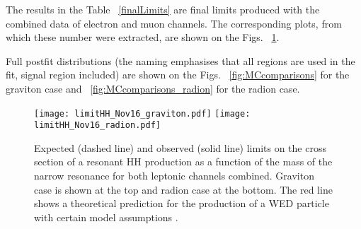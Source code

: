 The results in the Table ~\ref{finalLimits} are final limits produced with the combined data of electron and muon channels. The corresponding plots, from which these number were extracted, are shown on the Figs. ~\ref{fig:HHlimits}. %

Full postfit distributions (the naming emphasises that all regions are used in the fit, signal region included) are shown on the Figs. ~\ref{fig:MCcomparisons} for the graviton case and ~\ref{fig:MCcomparisons_radion} for the radion case. 







\begin{figure}[!htb]%
  \begin{center}
    \texttt{[image: limitHH\_Nov16\_graviton.pdf]}
    \texttt{[image: limitHH\_Nov16\_radion.pdf]}
    \caption{ Expected (dashed line) and observed (solid line) limits on the cross section of a resonant HH production
      as a function of the mass of the narrow resonance for both leptonic channels combined. Graviton case is shown at the top and radion case at the bottom. The red line shows a theoretical prediction for
      the production of a WED particle with certain model assumptions \cite{Oliveira:2014kla}.
      }
    \label{fig:HHlimits} %
  \end{center}
\end{figure}




